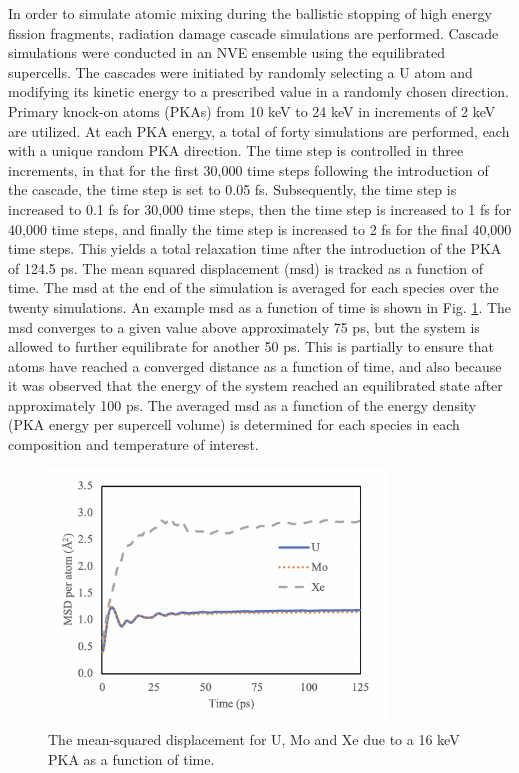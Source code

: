 \documentclass[review]{elsarticle}
\begin{document}
In order to simulate atomic mixing during the ballistic stopping of high energy fission fragments, radiation damage cascade simulations are performed. Cascade simulations were conducted in an NVE ensemble using the equilibrated supercells. The cascades were initiated by randomly selecting a U atom and modifying its kinetic energy to a prescribed value in a randomly chosen direction. Primary knock-on atoms (PKAs) from 10 keV to 24 keV in increments of 2 keV are utilized. At each PKA energy, a total of forty simulations are performed, each with a unique random PKA direction. The time step is controlled in three increments, in that for the first 30,000 time steps following the introduction of the cascade, the time step is set to 0.05 fs. Subsequently, the time step is increased to 0.1 fs for 30,000 time steps, then the time step is increased to 1 fs for 40,000 time steps, and finally the time step is increased to 2 fs for the final 40,000 time steps. This yields a total relaxation time after the introduction of the PKA of 124.5 ps. The mean squared displacement (msd) is tracked as a function of time. The msd at the end of the simulation is averaged for each species over the twenty simulations. An example msd as a function of time is shown in Fig. \ref{fig:msd}. The msd converges to a given value above approximately 75 ps, but the system is allowed to further equilibrate for another 50 ps. This is partially to ensure that atoms have reached a converged distance as a function of time, and also because it was observed that the energy of the system reached an equilibrated state after approximately 100 ps. The averaged msd as a function of the energy density (PKA energy per supercell volume) is determined for each species in each composition and temperature of interest. 

\begin{figure}[h]
 \centering
 \includegraphics[width=0.8\textwidth]{1_msd_vs_time.png} 
 \caption{ The mean-squared displacement for U, Mo and Xe due to a 16 keV PKA as a function of time.}
 \label{fig:msd}
\end{figure}
\end{document}
